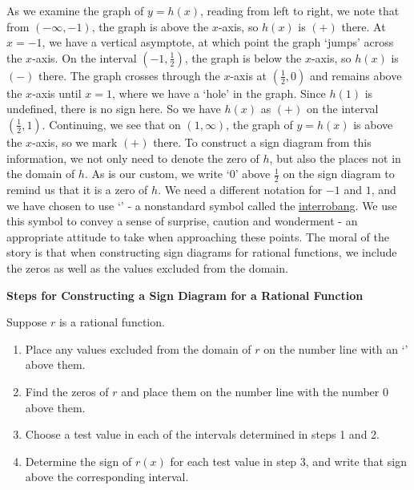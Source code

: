 As we examine the graph of $y=h(x)$, reading from left to right, we note that from $(-\infty,-1)$, the graph is above the $x$-axis, so $h(x)$ is $(+)$ there.  At $x=-1$, we have a vertical asymptote, at which point the graph `jumps' across the $x$-axis.  On the interval $\left(-1,\frac{1}{2}\right)$, the graph is below the $x$-axis, so $h(x)$ is $(-)$ there.  The graph crosses through the $x$-axis at $\left(\frac{1}{2},0\right)$ and remains above the $x$-axis until $x=1$, where we have a `hole' in the graph.  Since $h(1)$ is undefined, there is no sign here.  So we have $h(x)$ as $(+)$ on the interval $\left(\frac{1}{2}, 1\right)$.  Continuing, we see that on $(1, \infty)$, the graph of $y=h(x)$ is above the $x$-axis, so we mark $(+)$ there.  To construct a sign diagram from this information, we not only need to denote the zero of $h$, but also the places not in the domain of $h$.  As is our custom, we write `$0$' above $\frac{1}{2}$ on the sign diagram to remind us that it is a zero of $h$.  We need a different notation for $-1$ and $1$, and we have chosen to use `\textinterrobang' - a nonstandard symbol called the \href{http://en.wikipedia.org/wiki/Interrobang}{\underline{interrobang}}.   We use this symbol to convey a sense of surprise, caution and wonderment - an appropriate attitude to take when approaching these points.   The moral of the story is that when constructing sign diagrams for rational functions, we include the zeros as well as the values excluded from the domain.

\medskip

\label{rationalsigndiagram}

\colorbox{ResultColor}{\bbm

\centerline{\textbf{Steps for Constructing a Sign Diagram for a  Rational Function}} 

\medskip

\hspace{.17in} Suppose $r$ is a rational function. 

\begin{enumerate}

\item  Place any values excluded from the domain of  $r$ on the number line with an `\textinterrobang' above them.

\item  Find the zeros of $r$ and place them on the number line with the number $0$ above them.

\item  Choose a test value in each of the intervals determined in steps 1 and 2.

\item  Determine the sign of $r(x)$ for each test value in step 3, and write that sign above the corresponding interval.

\end{enumerate}

\ebm}

